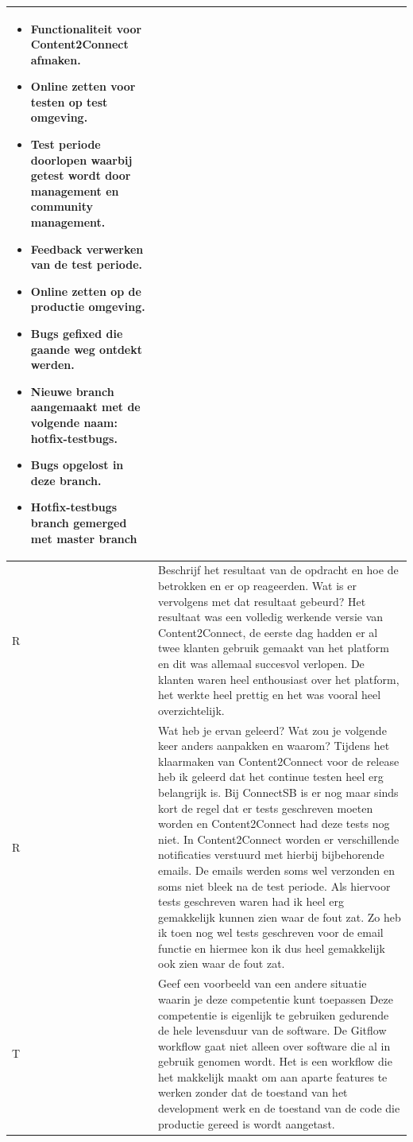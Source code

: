 \begin{tabularx}{\textwidth}{| l | X |}
\begin{itemize}
\item Functionaliteit voor Content2Connect afmaken.
\item Online zetten voor testen op test omgeving.
\item Test periode doorlopen waarbij getest wordt door management en community management.
\item Feedback verwerken van de test periode.
\item Online zetten op de productie omgeving.
\item Bugs gefixed die gaande weg ontdekt werden.
\item Nieuwe branch aangemaakt met de volgende naam: hotfix-testbugs.
\item Bugs opgelost in deze branch.
\item Hotfix-testbugs branch gemerged met master branch
\end{itemize}
\\
\hline
R & Beschrijf het resultaat van de opdracht en hoe de betrokken en er op reageerden. Wat is er vervolgens met dat resultaat gebeurd?
\newline
\newline
Het resultaat was een volledig werkende versie van  Content2Connect, de eerste dag hadden er al twee klanten gebruik gemaakt van het platform en dit was allemaal succesvol verlopen. De klanten waren heel enthousiast over het platform, het werkte heel prettig en het was vooral heel overzichtelijk.
\\
\hline
R & Wat heb je ervan geleerd? Wat zou je volgende keer anders aanpakken en waarom?
\newline
\newline
Tijdens het klaarmaken van Content2Connect voor de release heb ik geleerd dat het continue testen heel erg belangrijk is. Bij ConnectSB is er nog maar sinds kort de regel dat er tests geschreven moeten worden en Content2Connect had deze tests nog niet. In Content2Connect worden er verschillende notificaties verstuurd met hierbij bijbehorende emails. De emails werden soms wel verzonden en soms niet bleek na de test periode. Als hiervoor tests geschreven waren had ik heel erg gemakkelijk kunnen zien waar de fout zat. Zo heb ik toen nog wel tests geschreven voor de email functie en hiermee kon ik dus heel gemakkelijk ook zien waar de fout zat.
\\
\hline
T & Geef een voorbeeld van een andere situatie waarin je deze competentie kunt toepassen
\newline
\newline
Deze competentie is eigenlijk te gebruiken gedurende de hele levensduur van de software. De Gitflow workflow gaat niet alleen over software die al in gebruik genomen wordt. Het is een workflow die het makkelijk maakt om aan aparte features te werken zonder dat de toestand van het development werk en de toestand van de code die productie gereed is wordt aangetast.
\\
\hline
\end{tabularx}

